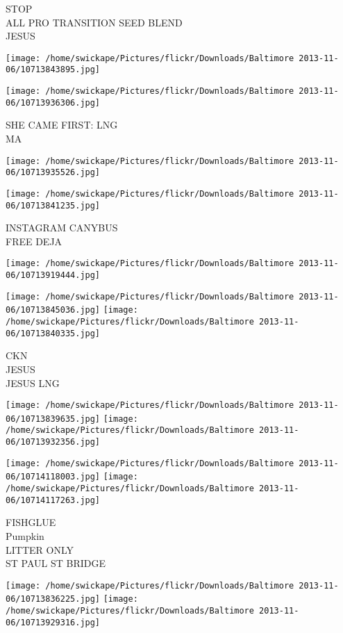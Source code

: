 \documentclass[10pt,letterpaper]{article}
\begin{document}
STOP\\
ALL PRO TRANSITION SEED BLEND\\
JESUS
\pagebreak

\texttt{[image: /home/swickape/Pictures/flickr/Downloads/Baltimore 2013-11-06/10713843895.jpg]}

\vspace{0.25in}
\texttt{[image: /home/swickape/Pictures/flickr/Downloads/Baltimore 2013-11-06/10713936306.jpg]}

SHE CAME FIRST: LNG\\
MA
\pagebreak

\texttt{[image: /home/swickape/Pictures/flickr/Downloads/Baltimore 2013-11-06/10713935526.jpg]}

\vspace{0.25in}
\texttt{[image: /home/swickape/Pictures/flickr/Downloads/Baltimore 2013-11-06/10713841235.jpg]}

INSTAGRAM CANYBUS\\
FREE DEJA
\pagebreak

\texttt{[image: /home/swickape/Pictures/flickr/Downloads/Baltimore 2013-11-06/10713919444.jpg]}

\vspace{0.25in}
\texttt{[image: /home/swickape/Pictures/flickr/Downloads/Baltimore 2013-11-06/10713845036.jpg]}
\texttt{[image: /home/swickape/Pictures/flickr/Downloads/Baltimore 2013-11-06/10713840335.jpg]}

CKN\\
JESUS\\
JESUS LNG
\pagebreak

\texttt{[image: /home/swickape/Pictures/flickr/Downloads/Baltimore 2013-11-06/10713839635.jpg]}
\texttt{[image: /home/swickape/Pictures/flickr/Downloads/Baltimore 2013-11-06/10713932356.jpg]}

\texttt{[image: /home/swickape/Pictures/flickr/Downloads/Baltimore 2013-11-06/10714118003.jpg]}
\texttt{[image: /home/swickape/Pictures/flickr/Downloads/Baltimore 2013-11-06/10714117263.jpg]}

FISHGLUE\\
Pumpkin\\
LITTER ONLY\\
ST PAUL ST BRIDGE
\pagebreak

\texttt{[image: /home/swickape/Pictures/flickr/Downloads/Baltimore 2013-11-06/10713836225.jpg]}
\texttt{[image: /home/swickape/Pictures/flickr/Downloads/Baltimore 2013-11-06/10713929316.jpg]}
\end{document}
